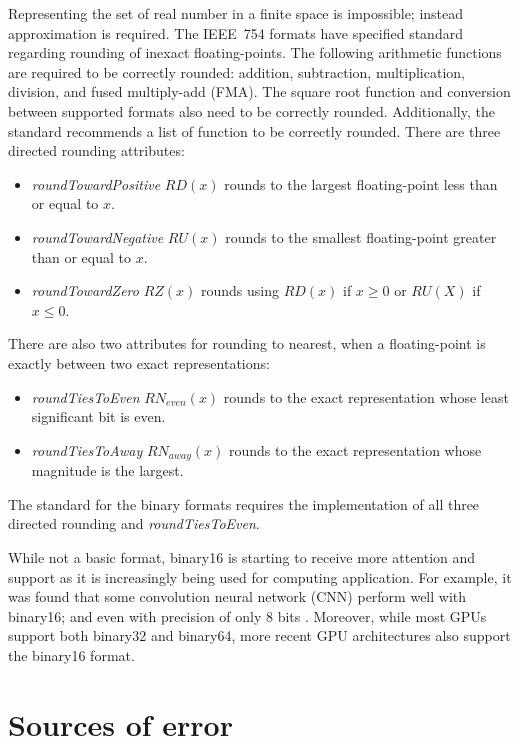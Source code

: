 Representing the set of real number in a finite space is impossible; instead approximation is required.
The IEEE~754 formats have specified standard regarding rounding of inexact floating-points.
The following arithmetic functions are required to be correctly rounded: addition, subtraction, multiplication, division, and fused multiply-add (FMA).
The square root function and conversion between supported formats also need to be correctly rounded.
Additionally, the standard recommends a list of function to be correctly rounded. %
There are three directed rounding attributes:
\begin{itemize}
	\item \textit{roundTowardPositive} $RD(x)$ rounds to the largest floating-point less than or equal to $x$.
	\item \textit{roundTowardNegative} $RU(x)$ rounds to the smallest floating-point greater than or equal to $x$.
	\item \textit{roundTowardZero} $RZ(x)$ rounds using $RD(x)$ if $x \ge 0$ or $RU(X)$ if $x \le 0$.
\end{itemize}
There are also two attributes for rounding to nearest, when a floating-point is exactly between two exact representations:
\begin{itemize}
	\item \textit{roundTiesToEven} $RN_{even}(x)$ rounds to the exact representation whose least significant bit is even.
	\item \textit{roundTiesToAway} $RN_{away}(x)$ rounds to the exact representation whose magnitude is the largest.
\end{itemize}
The standard for the binary formats requires the implementation of all three directed rounding and \textit{roundTiesToEven}.
				
While not a basic format, binary16 is starting to receive more attention and support as it is increasingly being used for computing application.
For example, it was found that some convolution neural network (CNN) perform well with binary16; and even with precision of only 8 bits .
Moreover, while most GPUs support both binary32 and binary64, more recent GPU architectures also support the binary16 format.
				
\section{Sources of error}
\begin{comment}
- rounding & double rounding
- cancellation
- overflow & underflow
- accumulation
- swamping

\end{comment}
